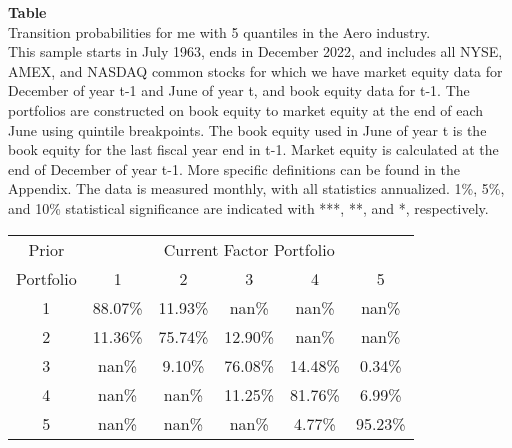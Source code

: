 \begin{table*}[ht!]
\raggedright
{}
\label{tab: transition_probs_me_Aero_with_5_quantiles}
\textbf{Table \thetable} \\
Transition probabilities for me with 5 quantiles in the Aero industry. \\
\hspace*{1em}This sample starts in July 1963, ends in December 2022, and includes all NYSE, AMEX, and NASDAQ common stocks for which we have market equity data for December of year t-1 and June of year t, and book equity data for t-1. The portfolios are constructed on book equity to market equity at the end of each June using quintile breakpoints.  The book equity used in June of year t is the book equity for the last fiscal year end in t-1.  Market equity is calculated at the end of December of year t-1.  More specific definitions can be found in the Appendix.  The data is measured monthly, with all statistics annualized.  1\%, 5\%, and 10\% statistical significance are indicated with ***, **, and *, respectively. \\
\vspace{0.5em}
\centering
\begin{adjustbox}{max width=\textwidth}
\begin{tabular}{@{}cccccc@{}}
\toprule
Prior & \multicolumn{5}{c}{Current Factor Portfolio} \\
Portfolio & 1 & 2 & 3 & 4 & 5 \\
\midrule
1 & 88.07\% & 11.93\% & nan\% & nan\% & nan\% \\
2 & 11.36\% & 75.74\% & 12.90\% & nan\% & nan\% \\
3 & nan\% & 9.10\% & 76.08\% & 14.48\% & 0.34\% \\
4 & nan\% & nan\% & 11.25\% & 81.76\% & 6.99\% \\
5 & nan\% & nan\% & nan\% & 4.77\% & 95.23\% \\
\bottomrule
\end{tabular}
\end{adjustbox}
\end{table*}